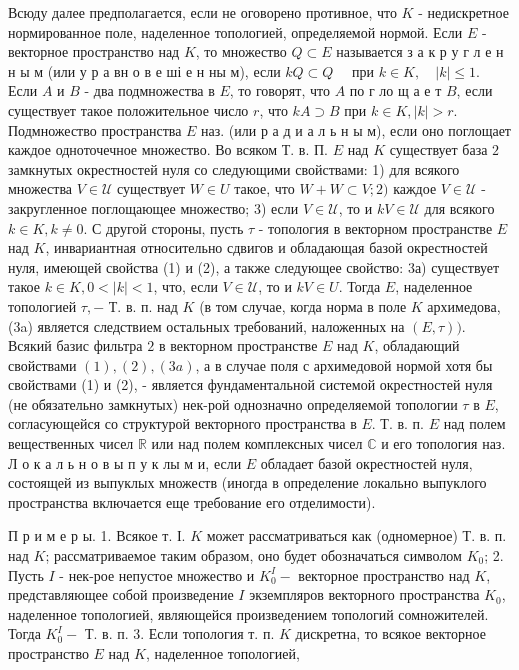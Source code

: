 \documentclass[10pt]{article}
\begin{document}
Всюду далее предполагается, если не оговорено противное, что $K$ - недискретное нормированное поле, наделенное топологией, определяемой нормой. Если $E$ - векторное пространство над $K$, то множество $Q \subset E$ называется з а к р у г л е н н ы м (или у р а вн о в е ші е н ны м), если $k Q \subset Q \quad$ при $k \in K, \quad|k| \leqslant 1$. Если $A$ и $B$ - два подмножества в $E$, то говорят, что $A$ по г ло щ а е т $B$, если существует такое положительное число $r$, что $k A \supset B$ при $k \in K,|k|>r$. Подмножество пространства $E$ наз. (или р а д и а л ь н ы м), если оно поглощает каждое одноточечное множество. Во всяком Т. в. П. $E$ над $K$ существует база $\mathcal{2}$ замкнутых окрестностей нуля со следующими свойствами: 1) для всякого множества $V \in \mathcal{U}$ существует $W \in U$ такое, что $W+W \subset V ; 2)$ каждое $V \in \mathcal{U}$ - закругленное поглощающее множество; 3) если $V \in \mathcal{U}$, то и $k V \in \mathcal{U}$ для всякого $k \in K, k \neq 0$. С другой стороны, пусть $\tau$ - топология в векторном пространстве $E$ над $K$, инвариантная относительно сдвигов и обладающая базой окрестностей нуля, имеющей свойства (1) и (2), а также следующее свойство: 3а) существует такое $k \in K, 0<|k|<1$, что, если $V \in \mathcal{U}$, то и $k V \in U$. Тогда $E$, наделенное топологией $\tau,-$ Т. в. п. над $K$ (в том случае, когда норма в поле $K$ архимедова, (3a) является следствием остальных требований, наложенных на $(E, \tau))$. Всякий базис фильтра $\mathcal{2}$ в векторном пространстве $E$ над $K$, обладающий свойствами $(1),(2),(3 a)$, а в случае поля с архимедовой нормой хотя бы свойствами (1) и (2), - является фундаментальной системой окрестностей нуля (не обязательно замкнутых) нек-рой однозначно определяемой топологии $\tau$ в $E$, согласующейся со структурой векторного пространства в $E$. Т. в. п. $E$ над полем вещественных чисел $\mathbb{R}$ или над полем комплексных чисел $\mathbb{C}$ и его топология наз. Л о к а л ь н о в ы п у к лы м и, если $E$ обладает базой окрестностей нуля, состоящей из выпуклых множеств (иногда в определение локально выпуклого пространства включается еще требование его отделимости).



П р и м е р ы. 1. Всякое т. І. $K$ может рассматриваться как (одномерное) Т. в. п. над $K$; рассматриваемое таким образом, оно будет обозначаться символом $K_{0}$; 2. Пусть $I$ - нек-рое непустое множество и $K_{0}^{I}-$ векторное пространство над $K$, представляющее собой произведение $I$ экземпляров векторного пространства $K_{0}$, наделенное топологией, являющейся произведением топологий сомножителей. Тогда $K_{0}^{I}-$ Т. в. п. 3. Если топология т. п. $K$ дискретна, то всякое векторное пространство $E$ над $K$, наделенное топологией,
\end{document}
